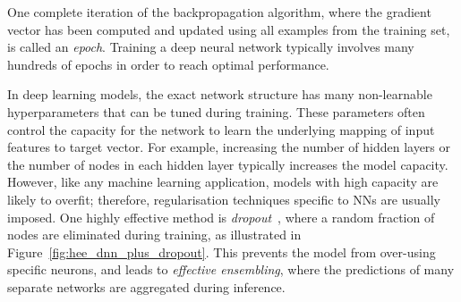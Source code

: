 \noindent One complete iteration of the backpropagation algorithm, where the gradient vector has been computed and updated using all examples from the training set, is called an \textit{epoch}. Training a deep neural network typically involves many hundreds of epochs in order to reach optimal performance.

In deep learning models, the exact network structure has many non-learnable hyperparameters that can be tuned during training. These parameters often control the capacity for the network to learn the underlying mapping of input features to target vector. For example, increasing the number of hidden layers or the number of nodes in each hidden layer typically increases the model capacity. However, like any machine learning application, models with high capacity are likely to overfit; therefore, regularisation techniques specific to NNs are usually imposed. One highly effective method is \emph{dropout}~\cite{dropout}, where a random fraction of nodes are eliminated during training, as illustrated in Figure~\ref{fig:hee_dnn_plus_dropout}. This prevents the model from over-using specific neurons, and leads to \textit{effective ensembling}, where the predictions of many separate networks are aggregated during inference.

